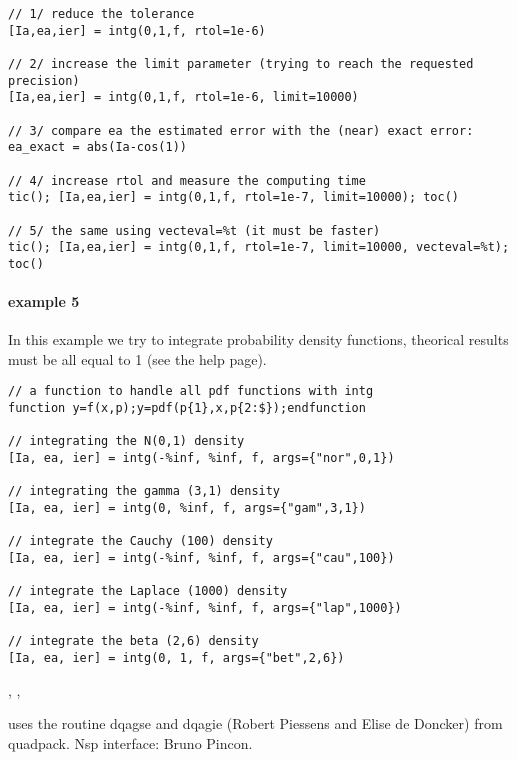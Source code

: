 \begin{examples}
\begin{Verbatim}
// 1/ reduce the tolerance
[Ia,ea,ier] = intg(0,1,f, rtol=1e-6)

// 2/ increase the limit parameter (trying to reach the requested precision)
[Ia,ea,ier] = intg(0,1,f, rtol=1e-6, limit=10000)

// 3/ compare ea the estimated error with the (near) exact error:
ea_exact = abs(Ia-cos(1))

// 4/ increase rtol and measure the computing time
tic(); [Ia,ea,ier] = intg(0,1,f, rtol=1e-7, limit=10000); toc()

// 5/ the same using vecteval=%t (it must be faster)
tic(); [Ia,ea,ier] = intg(0,1,f, rtol=1e-7, limit=10000, vecteval=%t); toc()
\end{Verbatim}

  
\paragraph{example 5} In this example we try to integrate probability 
density functions, theorical results must be all equal to 1 (see the
 help page). 
\begin{Verbatim}
// a function to handle all pdf functions with intg
function y=f(x,p);y=pdf(p{1},x,p{2:$});endfunction

// integrating the N(0,1) density
[Ia, ea, ier] = intg(-%inf, %inf, f, args={"nor",0,1})

// integrating the gamma (3,1) density
[Ia, ea, ier] = intg(0, %inf, f, args={"gam",3,1})

// integrate the Cauchy (100) density
[Ia, ea, ier] = intg(-%inf, %inf, f, args={"cau",100})

// integrate the Laplace (1000) density
[Ia, ea, ier] = intg(-%inf, %inf, f, args={"lap",1000})

// integrate the beta (2,6) density
[Ia, ea, ier] = intg(0, 1, f, args={"bet",2,6})
\end{Verbatim}

\end{examples}

\begin{manseealso}
  , ,    
\end{manseealso}

\begin{authors}
  uses the routine dqagse and dqagie (Robert Piessens and Elise de Doncker) from
  quadpack. Nsp interface: Bruno Pincon.
\end{authors}
